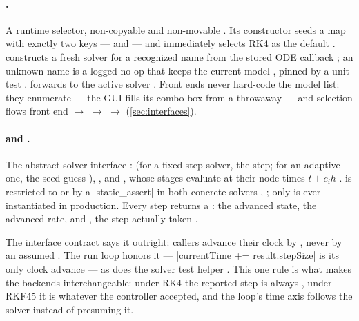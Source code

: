 \paragraph{.} A runtime selector, non-copyable and non-movable
. Its constructor seeds a map with exactly two keys ---
 and  --- and immediately selects RK4
as the default .  constructs a fresh solver
for a recognized name from the stored ODE callback ; an unknown name is
a logged no-op that keeps the current model , pinned by a unit test
.  forwards to the active solver
. Front ends never hard-code the model list: they enumerate
  --- the GUI fills its combo box
from a throwaway   --- and selection flows front
end $\to$   $\to$  $\to$ 
(\cref{sec:interfaces}).

\paragraph{ and .} The abstract solver interface
:  (for a fixed-step solver, the step; for an adaptive
one, the seed guess ), , and , whose stages evaluate at their node times $t + c_i h$ . 
is restricted to  or  by a \cppinline|static_assert| in both
concrete solvers , ; only
 is ever instantiated in production. Every step returns a
: the advanced state, the advanced rate, and , the step
actually taken .

\begin{designrule}
The interface contract says it outright: callers advance their clock by
, never by an assumed  . The run
loop honors it --- \cppinline|currentTime += result.stepSize| is its only clock advance
 --- as does the solver test helper
. This one rule is what makes the backends
interchangeable: under RK4 the reported step is always , under RKF45 it is whatever the
controller accepted, and the loop's time axis follows the solver instead of presuming it.
\end{designrule}

